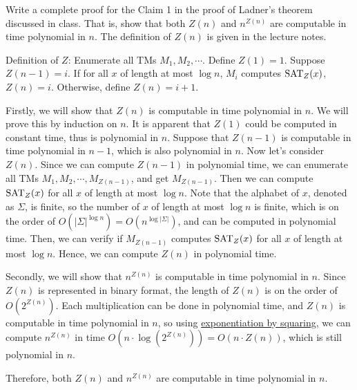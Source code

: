 \documentclass{homework}
\begin{document}
\begin{problem}
  Write a complete proof for the Claim 1 in the proof of Ladner's theorem
  discussed in class.
  That is, show that both $Z(n)$ and $n^{Z(n)}$ are computable in time
  polynomial in $n$.
  The definition of $Z(n)$ is given in the lecture notes.
\end{problem}

\begin{solution}

  Definition of $Z$: Enumerate all TMs $M_1, M_2, \cdots$. Define $Z(1) = 1$.
  Suppose $Z(n-1) = i$. If for all $x$ of length at most $\log n$,
  $M_i$ computes $\mathrm{SAT}_Z(x)$, $Z(n) = i$. Otherwise, define $Z(n) = i+1$.

  Firstly, we will show that $Z(n)$ is computable in time polynomial in $n$.
  We will prove this by induction on $n$.
  It is apparent that $Z(1)$ could be computed in constant time,
  thus is polynomial in $n$.
  Suppose that $Z(n-1)$ is computable in time polynomial in $n-1$,
  which is also polynomial in $n$.
  Now let's consider $Z(n)$.
  Since we can compute $Z(n - 1)$ in polynomial time,
  we can enumerate all TMs $M_1, M_2, \cdots, M_{Z(n-1)}$, and get $M_{Z(n-1)}$.
  Then we can compute $\mathrm{SAT}_Z(x)$ for all $x$ of length at most $\log n$.
  Note that the alphabet of $x$, denoted as $\Sigma$, is finite,
  so the number of $x$ of length at most $\log n$ is finite,
  which is on the order of $O(|\Sigma|^{\log n}) = O(n^{\log|\Sigma|})$,
  and can be computed in polynomial time.
  Then, we can verify if $M_{Z(n-1)}$ computes $\mathrm{SAT}_Z(x)$ for all $x$ of length at most $\log n$.
  Hence, we can compute $Z(n)$ in polynomial time.

  Secondly, we will show that $n^{Z(n)}$ is computable in time polynomial in $n$.
  Since $Z(n)$ is represented in binary format,
  the length of $Z(n)$ is on the order of $O(2^{Z(n)})$.
  Each multiplication can be done in polynomial time,
  and $Z(n)$ is computable in time polynomial in $n$,
  so using \href{https://en.wikipedia.org/wiki/Exponentiation_by_squaring}{exponentiation by squaring},
  we can compute $n^{Z(n)}$ in time $O(n \cdot \log(2^{Z(n)})) = O(n \cdot Z(n))$,
  which is still polynomial in $n$.

  Therefore, both $Z(n)$ and $n^{Z(n)}$ are computable in time polynomial in $n$.

\end{solution}
\end{document}

